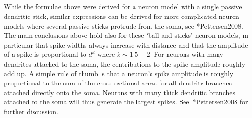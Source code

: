 \subsection{}
While the formulae above were derived for a neuron model with a single passive dendritic stick, similar expressions can be derived for 
more complicated neuron models where several passive sticks protrude from the soma, see \citeasnoun**{Pettersen2008}.
The main conclusions above hold also for these `ball-and-sticks' neuron models, in particular that spike widths always increase with distance and that
the amplitude of a spike is proportional to $d^{k}$ where $k\sim1.5-2$. For neurons with many dendrites attached to the 
soma, the contributions to the spike amplitude roughly add up. A simple rule of thumb is that a neuron's spike amplitude is 
roughly proportional to the sum of the cross-sectional areas for all dendrite branches attached directly onto the soma. Neurons with many thick dendritic branches attached to the soma will thus generate the largest spikes. See~\citeasnoun**{Pettersen2008} for further discussion.


